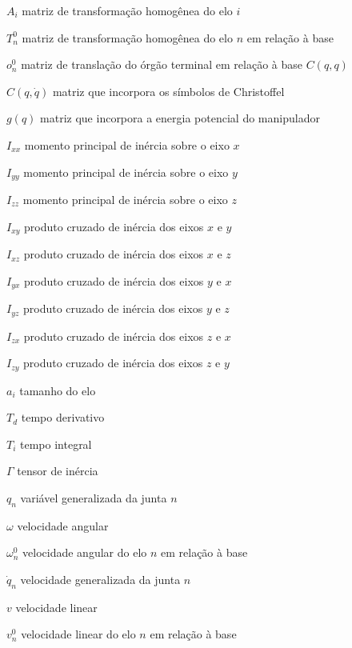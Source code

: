\begin{simbolos}
	\item[$ A_i $]		matriz de transformação homogênea do elo $i$
	\item[$ T_n^0 $]	matriz de transformação homogênea do elo $n$ em relação à base
	\item[$ o_n^0 $]	matriz de translação do órgão terminal em relação à base $C(q, q)$
	\item[$ C(q,\dot{q}) $]	matriz que incorpora os símbolos de Christoffel
	\item[$ g(q) $]		matriz que incorpora a energia potencial do manipulador
	\item[$ I_{xx} $]	momento principal de inércia sobre o eixo $x$
	\item[$ I_{yy} $]	momento principal de inércia sobre o eixo $y$
	\item[$ I_{zz} $]	momento principal de inércia sobre o eixo $z$
	\item[$ I_{xy} $]	produto cruzado de inércia dos eixos $x$ e $y$
	\item[$ I_{xz} $]	produto cruzado de inércia dos eixos $x$ e $z$
	\item[$ I_{yx} $]	produto cruzado de inércia dos eixos $y$ e $x$
	\item[$ I_{yz} $]	produto cruzado de inércia dos eixos $y$ e $z$
	\item[$ I_{zx} $]	produto cruzado de inércia dos eixos $z$ e $x$
	\item[$ I_{zy} $]	produto cruzado de inércia dos eixos $z$ e $y$
	\item[$ a_i $]		tamanho do elo
	\item[$T_d$]		tempo derivativo
	\item[$T_i$]		tempo integral
	\item[$ \Gamma $]	tensor de inércia
	\item[$ q_n $]		variável generalizada da junta $n$
	\item[$ \omega $]	velocidade angular
	\item[$ \omega_n^0 $]	velocidade angular do elo $n$ em relação à base
	\item[$ \dot{q}_n $]	velocidade generalizada da junta $n$
	\item[$ v $]		velocidade linear
	\item[$ v_n^0 $]	velocidade linear do elo $n$ em relação à base
\end{simbolos}